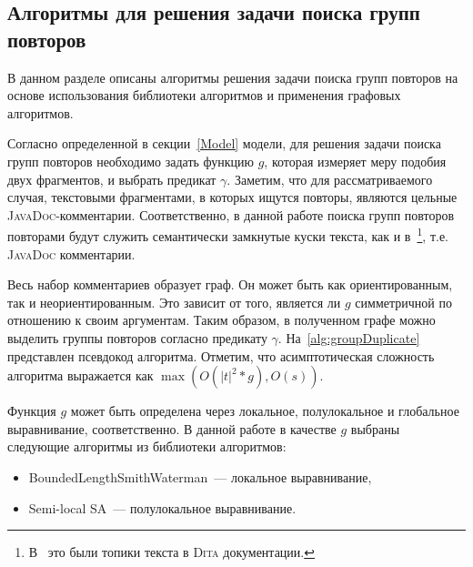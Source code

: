 



\subsection{Алгоритмы для решения задачи поиска групп повторов}\label{grouppa}
В данном разделе описаны алгоритмы решения задачи поиска групп повторов на основе использования библиотеки алгоритмов и применения графовых алгоритмов.

Согласно определенной в секции~\ref{Model} модели, для решения задачи поиска групп повторов необходимо
задать функцию $g$, которая измеряет меру подобия двух фрагментов, и выбрать предикат $\gamma$.
Заметим, что для рассматриваемого случая, текстовыми фрагментами, в которых ищутся повторы, являются цельные \textsc{JavaDoc}-комментарии.
Соответственно, в данной работе  поиска групп повторов повторами будут служить семантически замкнутые куски текста, как и в~\cite{soto2015similarity}\footnote{В~\cite{soto2015similarity} это были топики текста в \textsc{Dita} документации.}, т.е. \textsc{JavaDoc} комментарии.

Весь набор комментариев образует граф.
Он может быть как ориентированным, так и неориентированным.
Это зависит  от того, является ли $g$ симметричной по отношению к своим аргументам.
Таким образом, в полученном графе можно выделить группы повторов согласно предикату $\gamma$.
На~\ref{alg:groupDuplicate} представлен псевдокод алгоритма.
Отметим, что асимптотическая сложность алгоритма выражается как $\max (O(|t|^2*g), O(s))$.

Функция $g$ может быть определена через локальное, полулокальное и глобальное выравнивание, соответственно.
В данной работе в качестве $g$ выбраны следующие алгоритмы из библиотеки алгоритмов:
\begin{itemize}
    \item BoundedLengthSmithWaterman~--- локальное выравнивание,
    \item Semi-local SA~--- полулокальное выравнивание.
\end{itemize}

